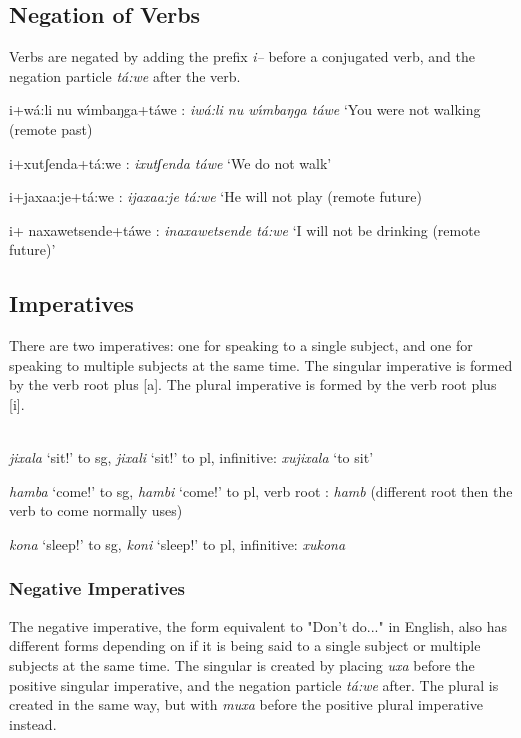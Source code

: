 \subsection{Negation of Verbs}
Verbs are negated by adding the prefix \emph{\esh{}i--} before a conjugated verb, and the negation particle \emph{t\'a:we} after the verb.\\

\begin{wrdex}
\item \esh{}i+w\'a:li nu w\'{\i}mbaŋga+t\'awe : \emph{\esh{}iw\'a:li nu w\'{\i}mbaŋga t\'awe} `You were not walking (remote past)
\item \esh{}i+xutʃenda+t\'a:we : \emph{\esh{}ixutʃenda t\'awe} `We do not walk'
\item \esh{}i+jaxa\beta{}a:je+t\'a:we : \emph{\esh{}ijaxa\beta{}a:je t\'a:we} `He will not play (remote future)
\item \esh{}i+ naxa\engma{}wetsend\ezh{}e+t\'awe : \emph{\esh{}inaxa\engma{}wetsend\ezh{}e t\'a:we} `I will not be drinking (remote future)'
\end{wrdex}

\subsection{Imperatives}
There are two imperatives: one for speaking to a single subject, and one for speaking to multiple subjects at the same time.  The singular imperative is formed by the verb root plus [a].  The plural imperative is formed by the verb root plus [i].\\
\\

\begin{wrdex}
\item \emph{jixala} `sit!' to sg, \emph{jixali} `sit!' to pl, infinitive: \emph{xujixala} `to sit'
\item \emph{hamba} `come!' to sg, \emph{hambi} `come!' to pl, verb root : \emph{hamb} (different root then the verb to come normally uses)
\item \emph{kona} `sleep!' to sg, \emph{koni} `sleep!' to pl, infinitive: \emph{xukona}
\end{wrdex}

\subsubsection{Negative Imperatives}
The negative imperative, the form equivalent to "Don't do..." in English, also has different forms depending on if it is being said to a single subject or multiple subjects at the same time.  The singular is created by placing \emph{uxa} before the positive singular imperative, and the negation particle \emph{t\'a:we} after.  The plural is created in the same way, but with \emph{muxa} before the positive plural imperative instead.\\
\\

